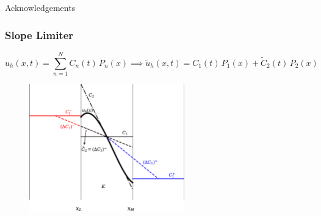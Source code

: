 \documentclass{beamer}
\begin{document}
\begin{frame}

  \begin{center}
    {\Large Acknowledgements}
  \end{center}

\end{frame}


\appendix

\begin{frame}
\frametitle{Slope Limiter}

  \Fontvi
  \begin{equation*}
  u_{h}\left(x,t\right)
  =\sum\limits_{n=1}^{N}
  C_{n}\left(t\right)\,P_{n}\left(x\right)\implies
  \tilde{u}_{h}\left(x,t\right)
  =C_{1}\left(t\right)\,P_{1}\left(x\right)
  +\tilde{C}_{2}\left(t\right)\,P_{2}\left(x\right)
  \end{equation*}

  \begin{figure}[htb!]
    \centering
    \includegraphics[width=0.6\textwidth]{fig.MinMod.jpeg}
  \end{figure}

\end{frame}
\end{document}
